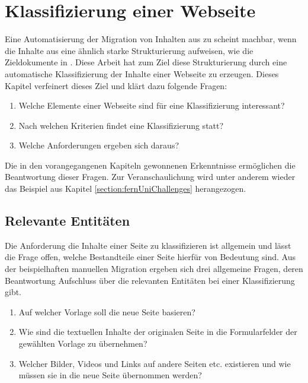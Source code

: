 \section{Klassifizierung einer Webseite}
    \label{section:WebpageClassification}
    Eine Automatisierung der Migration von Inhalten aus {\wordpress} zu {\imperia} scheint machbar,
    wenn die Inhalte aus {\wordpress} eine ähnlich starke Strukturierung aufweisen,
    wie die Zieldokumente in {\imperia}.
    Diese Arbeit hat zum Ziel diese Strukturierung
    durch eine automatische Klassifizierung der Inhalte einer Webseite zu erzeugen.
    Dieses Kapitel verfeinert dieses Ziel und klärt dazu folgende Fragen:

    \begin{enumerate}
        \item Welche Elemente einer Webseite sind für eine Klassifizierung interessant?
        \item Nach welchen Kriterien findet eine Klassifizierung statt?
        \item Welche Anforderungen ergeben sich daraus?
    \end{enumerate}

    Die in den vorangegangenen Kapiteln gewonnenen Erkenntnisse ermöglichen
    die Beantwortung dieser Fragen.
    Zur Veranschaulichung wird unter anderem wieder das Beispiel aus Kapitel
    \ref{section:fernUniChallenges} herangezogen.

    \subsection{Relevante Entitäten}
        \label{section:classificationEntities}
        Die Anforderung die Inhalte einer Seite zu klassifizieren
        ist allgemein und lässt die Frage offen,
        welche Bestandteile einer Seite hierfür von Bedeutung sind.
        Aus der beispielhaften manuellen Migration
        ergeben sich drei allgemeine Fragen,
        deren Beantwortung Aufschluss über die relevanten Entitäten
        bei einer Klassifizierung gibt.

        \begin{enumerate}
            \item   Auf welcher Vorlage soll die neue Seite basieren?
            \item   Wie sind die textuellen Inhalte der originalen Seite
                    in die Formularfelder der gewählten Vorlage zu übernehmen?
            \item   Welcher Bilder, Videos und Links auf andere Seiten etc. existieren
                    und wie müssen sie in die neue Seite übernommen werden?
        \end{enumerate}

